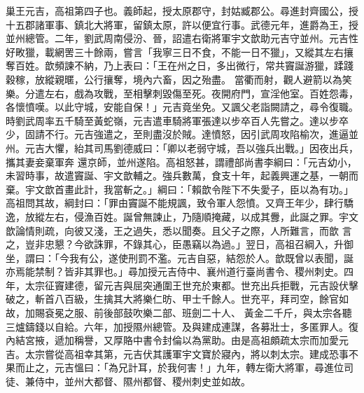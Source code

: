 \begin{pinyinscope}
 巢王元吉，高祖第四子也。義師起，授太原郡守，封姑臧郡公。尋進封齊國公，授十五郡諸軍事、鎮北大將軍，留鎮太原，許以便宜行事。武德元年，進爵為王，授並州總管。二年，劉武周南侵汾、晉，詔遣右衛將軍宇文歆助元吉守並州。元吉性好畋獵，載網罟三十餘兩，嘗言「我寧三日不食，不能一日不獵」，又縱其左右攘奪百姓。歆頻諫不納，乃上表曰：「王在州之日，多出微行，常共竇誕游獵，蹂踐穀稼，放縱親暱，公行攘奪，境內六畜，因之殆盡。
 當衢而射，觀人避箭以為笑樂。分遣左右，戲為攻戰，至相擊刺毀傷至死。夜開府門，宣淫他室。百姓怨毒，各懷憤嘆。以此守城，安能自保！」元吉竟坐免。又諷父老詣闕請之，尋令復職。時劉武周率五千騎至黃蛇嶺，元吉遣車騎將軍張達以步卒百人先嘗之。達以步卒少，固請不行。元吉強遣之，至則盡沒於賊。達憤怒，因引武周攻陷榆次，進逼並州。元吉大懼，紿其司馬劉德威曰：「卿以老弱守城，吾以強兵出戰。」因夜出兵，攜其妻妾棄軍奔
 還京師，並州遂陷。高祖怒甚，謂禮部尚書李綱曰：「元吉幼小，未習時事，故遣竇誕、宇文歆輔之。強兵數萬，食支十年，起義興運之基，一朝而棄。宇文歆首畫此計，我當斬之。」綱曰：「賴歆令陛下不失愛子，臣以為有功。」高祖問其故，綱封曰：「罪由竇誕不能規諷，致令軍人怨憤。又齊王年少，肆行驕逸，放縱左右，侵漁百姓。誕曾無諫止，乃隨順掩藏，以成其釁，此誕之罪。宇文歆論情則疏，向彼又淺，王之過失，悉以聞奏。且父子之際，人所難言，而歆
 言之，豈非忠懇？今欲誅罪，不錄其心，臣愚竊以為過。」翌日，高祖召綱入，升御坐，謂曰：「今我有公，遂使刑罰不濫。元吉自惡，結怨於人。歆既曾以表聞，誕亦焉能禁制？皆非其罪也。」尋加授元吉侍中、襄州道行臺尚書令、稷州刺史。四年，太宗征竇建德，留元吉與屈突通圍王世充於東都。世充出兵拒戰，元吉設伏擊破之，斬首八百級，生擒其大將樂仁昉、甲士千餘人。世充平，拜司空，餘官如故，加賜袞冕之服、前後部鼓吹樂二部、班劍二十人、
 黃金二千斤，與太宗各聽三爐鑄錢以自給。六年，加授隰州總管。及與建成連謀，各募壯士，多匿罪人。復內結宮掖，遞加稱譽，又厚賂中書令封倫以為黨助。由是高祖頗疏太宗而加愛元吉。太宗嘗從高祖幸其第，元吉伏其護軍宇文寶於寢內，將以刺太宗。建成恐事不果而止之，元吉慍曰：「為兄計耳，於我何害！」九年，轉左衛大將軍，尋進位司徒、兼侍中，並州大都督、隰州都督、稷州刺史並如故。




\end{pinyinscope}
